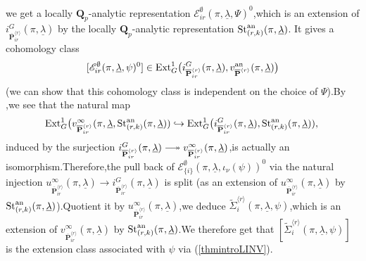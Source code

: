 \documentclass[SecEq,CM,GP]{degruyter-crelle} %
\theoremstyle{plain}
\newcommand{\twoheadlongrightarrow}{\relbar\joinrel\twoheadrightarrow}
\newcommand{\ana}{{\rm an}}
\newcommand{\ext}{{\rm Ext}}
\newcommand{\lrr}{{\langle r\rangle}}
\newcommand{\op}{{\overline{{\mathbf{P}}}}}
\newcommand{\st}{{\rm St}}
\newcommand{\ul}{\underline}
\newcommand{\bQ}{{\mathbf{Q}}}
\newcommand{\sE}{\mathscr E}
\begin{document}
we get a locally $\bQ_p$-analytic representation  $\sE_{ir}^\emptyset(\pi,\ul{\lambda},\Psi)^0$,\;which is an extension of $i_{\op^{\lrr}_{{ir}}}^G(\pi,\ul{\lambda})$ by the locally $\bQ_p$-analytic representation $\st_{(r,k)}^{\ana}(\pi,\ul{\lambda})$. It gives a cohomology class  \[[\sE_{ir}^\emptyset(\pi,\ul{\lambda},\psi)^0]\in \ext^{1}_{G}\big(i_{\op^{\lrr}_{{ir}}}^G(\pi,\ul{\lambda}), v^{\ana}_{\op^{\lrr}}(\pi,\ul{\lambda})\big)\] (we can show that this cohomology class is independent on the choice of $\Psi$).\;By \cite[Theorem 5.19]{2022ext1hyq},\;we see that the natural map
$$\ext^1_{G}\big(v_{\op^{\lrr}_{{ir}}}^{\infty}(\pi,\ul{\lambda}, \st_{(r,k)}^{\ana}(\pi,\ul{\lambda}))\hookrightarrow\ext^1_{G}\big(i_{\op^{\lrr}_{{ir}}}^G(\pi,\ul{\lambda}),\st_{(r,k)}^{\ana}(\pi,\ul{\lambda})),\;$$
induced by the surjection $i_{\op^{\lrr}_{{ir}}}^G(\pi,\ul{\lambda})\twoheadlongrightarrow v_{\op^{\lrr}_{{ir}}}^{\infty}(\pi,\ul{\lambda})$,\;is actually an isomorphism.\;Therefore,\;the pull back of $\sE_{\{i\}}^\emptyset(\pi,\ul{\lambda},\iota_\nu(\psi))^0$ via the natural injection $u_{\op^{\lrr}_{{ir}}}^{\infty}(\pi,\ul{\lambda}) \rightarrow i_{\op^{\lrr}_{{ir}}}^G(\pi,\ul{\lambda})$ is split (as an extension of $u_{\op^{\lrr}_{{ir}}}^{\infty}(\pi,\ul{\lambda})$ by $\st_{(r,k)}^{\ana}(\pi,\ul{\lambda})$).\;Quotient it by $u_{\op^{\lrr}_{{ir}}}^{\infty}(\pi,\ul{\lambda})$,\;we deduce $\widetilde{{\Sigma}}_i^{\lrr}(\pi,\ul{\lambda}, \psi)$,\;which is an extension of $v_{\op^{\lrr}_{{ir}}}^{\infty}(\pi,\ul{\lambda})$ by $\st_{(r,k)}^{\ana}(\pi,\ul{\lambda})$.\;We therefore get that $[\widetilde{{\Sigma}}_i^{\lrr}(\pi,\ul{\lambda}, \psi)]$ is the extension class associated with $\psi$ via (\ref{thmintroLINV}).\
\end{document}
